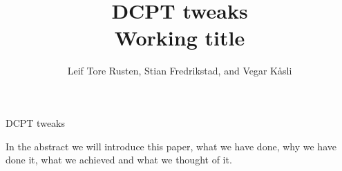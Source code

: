 \documentclass[12pt,journal,compsoc]{IEEEtran}
\begin{document}
\title{DCPT tweaks \\ Working title}
\author{Leif Tore Rusten,
        Stian Fredrikstad,
        and Vegar K\aa sli}

%
{DCPT tweaks}



\maketitle


\IEEEdisplaynotcompsoctitleabstractindextext
In the abstract we will introduce this paper, what we have done, why we have
done it, what we achieved and what we thought of it.

%
\IEEEpeerreviewmaketitle
\end{document}
